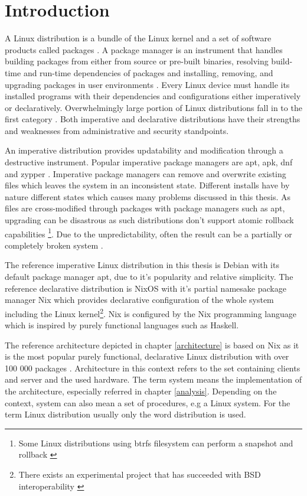 \chapter{Introduction} \label{johdanto}

A Linux distribution is a bundle of the Linux kernel and a set of
software products called packages \cite{gnuPackagesx2014}. A package
manager is an instrument that handles building packages from either
from source or pre-built binaries, resolving build-time and run-time
dependencies of packages and installing, removing, and upgrading
packages in user environments \cite{gnuPackagesx2014}. Every Linux
device must handle its installed programs with their dependencies and
configurations either imperatively or declaratively. Overwhelmingly
large portion of Linux distributions fall in to the first category
\cite{dolstra2008nixos}. Both imperative and declarative distributions
have their strengths and weaknesses from administrative and security
standpoints.

An imperative distribution provides updatability and modification through a
destructive instrument. Popular imperative package managers are apt,
apk, dnf and zypper \cite{dolstra2008nixos}. Imperative package
managers can remove and overwrite existing files which leaves the
system in an inconsistent state. Different installs have by nature
different states which causes many problems discussed in this
thesis. As files are cross-modified through packages with package
managers such as apt, upgrading can be disastrous as such distributions
don't support atomic rollback capabilities \footnote{Some Linux
distributions using btrfs filesystem can perform a snapshot and
rollback \cite{opensuseSystemRecovery}}. Due to the unpredictability,
often the result can be a partially or completely broken system
\cite{dolstra2008nixos}.

The reference imperative Linux distribution in this thesis is Debian
with its default package manager apt, due to it's popularity and
relative simplicity. The reference declarative distribution is NixOS
with it's partial namesake package manager Nix which provides
declarative configuration of the whole system including the Linux
kernel\footnote{There exists an experimental project that has
succeeded with BSD interoperability
\cite{githubGitHubNixosbsdnixbsd}}. Nix is configured by the Nix
programming language which is inspired by purely functional languages
such as Haskell. \cite{van2013reference}

The reference architecture depicted in chapter \ref{architecture} is
based on Nix as it is the most popular purely functional, declarative
Linux distribution with over 100 000 packages
\cite{nixosNixOSSearch}. Architecture in this context refers to the
set containing clients and server and the used hardware. The term
system means the implementation of the architecture, especially
referred in chapter \ref{analysis}. Depending on the context, system
can also mean a set of procedures, e.g a Linux system. For the term
Linux distribution usually only the word distribution is used.


